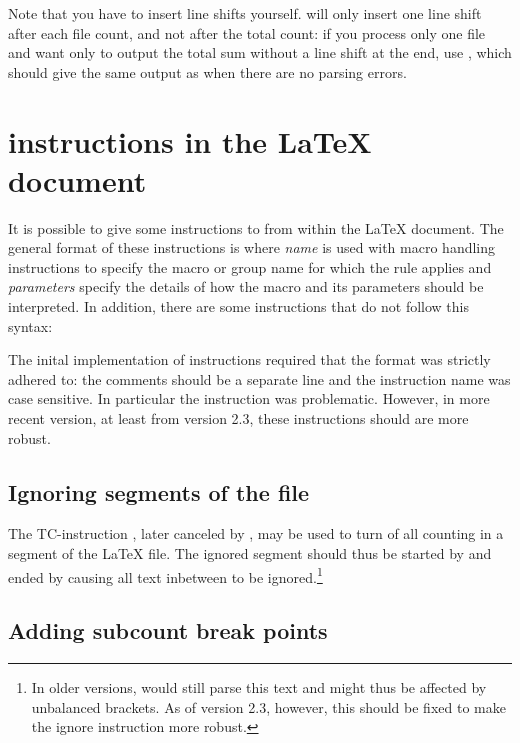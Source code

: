 \documentclass{article}
\begin{document}
Note that you have to insert line shifts yourself. \TeXcount{} will only insert one line shift after each file count, and not after the total count: if you process only one file and want only to output the total sum without a line shift at the end, use , which should give the same output as  when there are no parsing errors.


\section{\TeXcount{} instructions in the \LaTeX{} document}

It is possible to give some instructions to \TeXcount{} from within the
\LaTeX{} document. The general format of these instructions is
where \textit{name} is used with macro handling instructions to specify the macro or group name for which the rule applies and \textit{parameters} specify the details of how the macro and its parameters should be interpreted. In addition, there are some \TeXcount{} instructions that do not follow this syntax:
%


The inital implementation of \TeXcount{} instructions required that the format was strictly adhered to: the comments should be a separate line and the instruction name was case sensitive. In particular the  instruction was problematic. However, in more recent version, at least from version 2.3, these \TeXcount{} instructions should are more robust.

\subsection{Ignoring segments of the file}

The TC-instruction , later canceled by , may be used to turn of all counting in a segment of the \LaTeX{} file. The ignored segment should thus be started by
and ended by
causing all text inbetween to be ignored.\footnote{In older versions, \TeXcount{} would still parse this text and might thus be affected by unbalanced brackets. As of version 2.3, however, this should be fixed to make the ignore instruction more robust.}

\subsection{Adding subcount break points}
\end{document}
